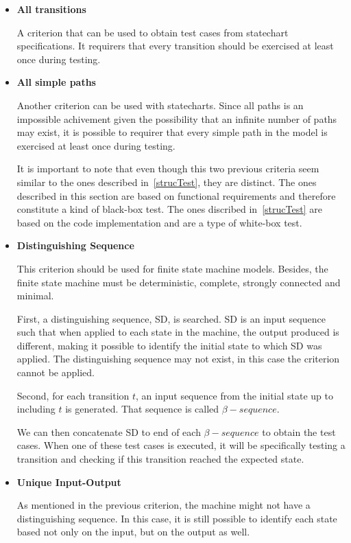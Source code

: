 \begin{itemize}

\item \textbf{All transitions}

A criterion that can be used to obtain test cases from statechart specifications. It requirers that every transition should be exercised at least once during testing.

\item \textbf{All simple paths}

Another criterion can be used with statecharts. Since all paths is an impossible achivement given the possibility that an infinite number of paths may exist, it is possible to requirer that every simple path in the model is exercised at least once during testing.

It is important to note that even though this two previous criteria seem similar to the ones described in~\ref{strucTest}, they are distinct. The ones described in this section are based on functional requirements and therefore constitute a kind of black-box test. The ones discribed in~\ref{strucTest} are based on the code implementation and are a type of white-box test.

\item \textbf{Distinguishing Sequence}

This criterion should be used for finite state machine models. Besides, the finite state machine must be deterministic, complete, strongly connected and minimal. 

First, a distinguishing sequence, SD, is searched. SD is an input sequence such that when applied to each state in the machine, the output produced is different, making it possible to identify the initial state to which SD was applied. The distinguishing sequence may not exist, in this case the criterion cannot be applied.

Second, for each transition $t$, an input sequence from the initial state up to including $t$ is generated. That sequence is called $\beta-sequence$.

We can then concatenate SD to end of each $\beta-sequence$ to obtain the test cases. When one of these test cases is executed, it will be specifically testing a transition and checking if this transition reached the expected state.

\item \textbf{Unique Input-Output}

As mentioned in the previous criterion, the machine might not have a distinguishing sequence. In this case, it is still possible to identify each state based not only on the input, but on the output as well.


\end{itemize}
